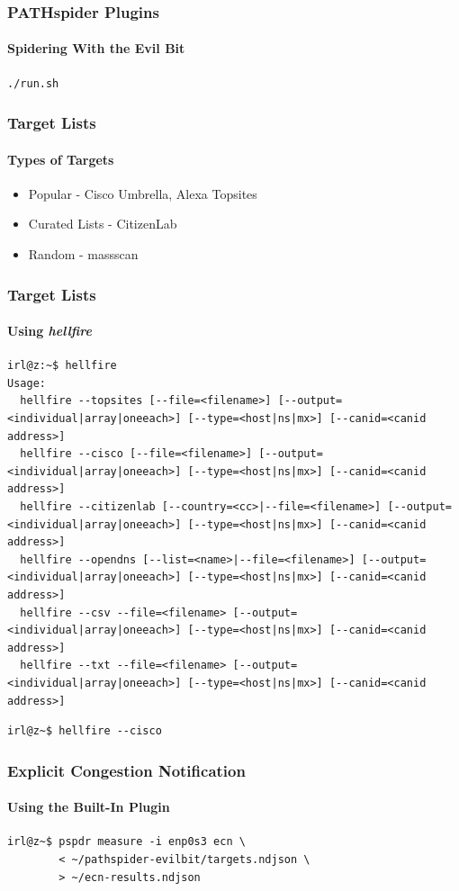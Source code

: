\documentclass{beamer}
\begin{document}
\begin{frame}[fragile]
\frametitle{PATHspider Plugins}
\framesubtitle{Spidering With the Evil Bit}
\begin{lstlisting}[caption={Running the Evil Bit Plugin}]
./run.sh
\end{lstlisting}
\end{frame}

\begin{frame}
\frametitle{Target Lists}
\framesubtitle{Types of Targets}
\begin{itemize}
\item{Popular - Cisco Umbrella, Alexa Topsites}
\item{Curated Lists - CitizenLab}
\item{Random - massscan}
\end{itemize}
\end{frame}

\begin{frame}[fragile]
\frametitle{Target Lists}
\framesubtitle{Using \textit{hellfire}}
\begin{lstlisting}[caption={\textit{hellfire}'s Usage Help}]
irl@z:~$ hellfire
Usage:
  hellfire --topsites [--file=<filename>] [--output=<individual|array|oneeach>] [--type=<host|ns|mx>] [--canid=<canid address>]
  hellfire --cisco [--file=<filename>] [--output=<individual|array|oneeach>] [--type=<host|ns|mx>] [--canid=<canid address>]
  hellfire --citizenlab [--country=<cc>|--file=<filename>] [--output=<individual|array|oneeach>] [--type=<host|ns|mx>] [--canid=<canid address>]
  hellfire --opendns [--list=<name>|--file=<filename>] [--output=<individual|array|oneeach>] [--type=<host|ns|mx>] [--canid=<canid address>]
  hellfire --csv --file=<filename> [--output=<individual|array|oneeach>] [--type=<host|ns|mx>] [--canid=<canid address>]
  hellfire --txt --file=<filename> [--output=<individual|array|oneeach>] [--type=<host|ns|mx>] [--canid=<canid address>]
\end{lstlisting}
\begin{lstlisting}[caption={Start Resolving the Cisco Umbrella List}]
irl@z~$ hellfire --cisco
\end{lstlisting}
\end{frame}

\begin{frame}[fragile]
\frametitle{Explicit Congestion Notification}
\framesubtitle{Using the Built-In Plugin}
\begin{lstlisting}[caption={Start Resolving the Cisco Umbrella List}]
irl@z~$ pspdr measure -i enp0s3 ecn \
        < ~/pathspider-evilbit/targets.ndjson \
        > ~/ecn-results.ndjson
\end{lstlisting}
\end{frame}
\end{document}
